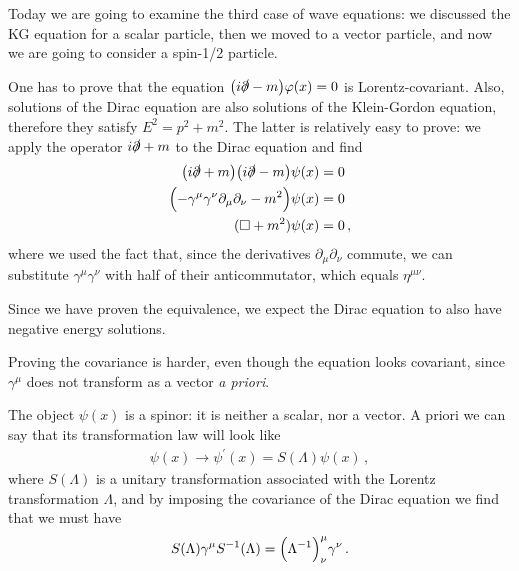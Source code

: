 \documentclass[main.tex]{subfiles}
\begin{document}

Today we are going to examine the third case of wave equations: we discussed the KG equation for a scalar particle, then we moved to a vector particle, and now we are going to consider a spin-1/2 particle. 


One has to prove that the equation \(\qty(i \slashed{\partial} - m)  \varphi (x )=0\) is Lorentz-covariant. 
Also, solutions of the Dirac equation are also solutions of the Klein-Gordon equation, therefore they satisfy \(E^2=p^2+m^2\). 
The latter is relatively easy to prove: we apply the operator \(i \slashed{\partial} + m\) to the Dirac equation and find 
%
\begin{align}
\qty(i \slashed{\partial} + m) \qty(i \slashed{\partial} - m) \psi (x) &= 0  \\
\qty(- \gamma^{\mu } \gamma^{\nu } \partial_{\mu } \partial_{\nu } - m^2 ) \psi (x) &= 0  \\
(\square + m^2 )\psi (x) &= 0 
\,,
\end{align}
%
where we used the fact that, since the derivatives \(\partial_{\mu } \partial_{\nu } \) commute, we can substitute \(\gamma^{\mu } \gamma^{\nu }\) with half of their anticommutator, which equals \(\eta^{\mu \nu }\). 

Since we have proven the equivalence, we expect the Dirac equation to also have negative energy solutions.

Proving the covariance is harder, even though the equation looks covariant, since \(\gamma^{\mu }\) does not transform as a vector \emph{a priori}. 

The object \(\psi (x)\) is a spinor: it is neither a scalar, nor a vector. A priori we can say that its transformation law will look like 
%
\begin{align}
\psi (x) \rightarrow \psi^{\prime } (x) = S(\Lambda ) \psi (x)
\,,
\end{align}
%
where \(S(\Lambda )\) is a unitary transformation associated with the Lorentz transformation \(\Lambda \), and by imposing the covariance of the Dirac equation we find that we must have 
%
\begin{align}
S (\Lambda ) \gamma^{\mu } S^{-1} (\Lambda ) = \qty(\Lambda^{-1})^{\mu }_{\nu } \gamma^{\nu }
\,.
\end{align}
\end{document}
